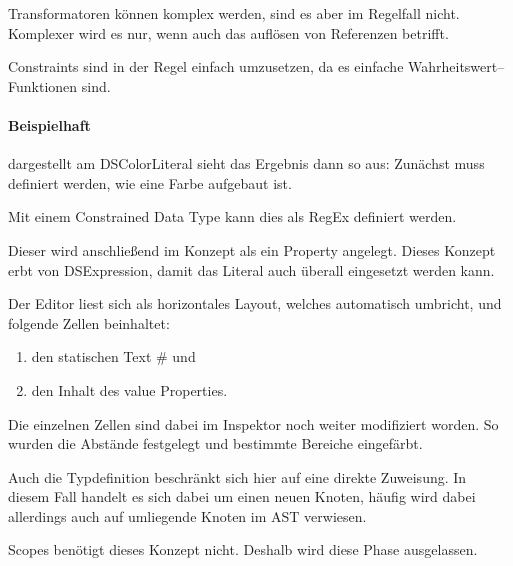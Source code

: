 Transformatoren können komplex werden, sind es aber im Regelfall nicht.
Komplexer wird es nur, wenn auch das auflösen von Referenzen betrifft.

Constraints sind in der Regel einfach umzusetzen, da es einfache Wahrheitswert--Funktionen sind.

\paragraph{Beispielhaft} dargestellt am {\ttfamily DSColorLiteral} sieht das Ergebnis dann so aus:
Zunächst muss definiert werden, wie eine Farbe aufgebaut ist.

Mit einem {\ttfamily Constrained Data Type} kann dies als \ac{RegEx} definiert werden.


Dieser wird anschließend im Konzept als ein Property angelegt.
Dieses Konzept erbt von {\ttfamily DSExpression}, damit das Literal auch überall eingesetzt werden kann.


Der Editor liest sich als horizontales Layout, welches automatisch umbricht, und folgende Zellen beinhaltet:
\begin{enumerate}
    \item den statischen Text {\ttfamily \#} und
    \item den Inhalt des {\ttfamily value} Properties.
\end{enumerate}
Die einzelnen Zellen sind dabei im Inspektor noch weiter modifiziert worden.
So wurden die Abstände festgelegt und bestimmte Bereiche eingefärbt.


Auch die Typdefinition beschränkt sich hier auf eine direkte Zuweisung.
In diesem Fall handelt es sich dabei um einen neuen Knoten, häufig wird dabei allerdings auch auf umliegende Knoten im \ac{AST} verwiesen.

Scopes benötigt dieses Konzept nicht.
Deshalb wird diese Phase ausgelassen.


